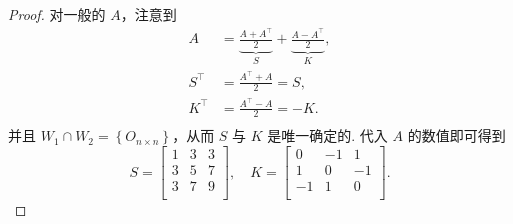 \begin{proof}
对一般的 $A$，注意到
\[
\begin{aligned}
    A &= \underbrace{\frac{A + A^\top}{2}}_{S} + \underbrace{\frac{A - A^\top}{2}}_{K}, \\
    S^\top &= \frac{A^\top + A}{2} = S, \\
    K^\top &= \frac{A^\top - A}{2} = -K. \\
\end{aligned}
\]
并且 $W_1 \cap W_2 = \left\{O_{n \times n}\right\}$，从而 $S$ 与 $K$ 是唯一确定的. 代入 $A$ 的数值即可得到
\[
S = \boxed{\begin{bmatrix}
    1 & 3 & 3 \\
    3 & 5 & 7 \\
    3 & 7 & 9 \\
\end{bmatrix}}, \quad
K = \boxed{\begin{bmatrix}
    0 & -1 & 1 \\
    1 & 0 & -1 \\
    -1 & 1 & 0 \\
\end{bmatrix}}.
\]
\end{proof}

